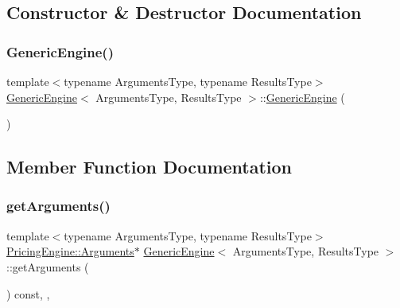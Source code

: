 \subsection{Constructor \& Destructor Documentation}
\hypertarget{class_generic_engine_a080b4df876712b5529b4a19ec3b0c48f}{}\label{class_generic_engine_a080b4df876712b5529b4a19ec3b0c48f} 
\subsubsection{\texorpdfstring{Generic\+Engine()}{GenericEngine()}}
{\footnotesize\ttfamily template$<$typename Arguments\+Type, typename Results\+Type$>$ \\
\hyperlink{class_generic_engine}{Generic\+Engine}$<$ Arguments\+Type, Results\+Type $>$\+::\hyperlink{class_generic_engine}{Generic\+Engine} (\begin{DoxyParamCaption}{ }\end{DoxyParamCaption})\hspace{0.3cm}{\ttfamily [inline]}}



\subsection{Member Function Documentation}
\hypertarget{class_generic_engine_ac2adcbbc8d7b554e2cc1f90e4c4d055d}{}\label{class_generic_engine_ac2adcbbc8d7b554e2cc1f90e4c4d055d} 
\subsubsection{\texorpdfstring{get\+Arguments()}{getArguments()}}
{\footnotesize\ttfamily template$<$typename Arguments\+Type, typename Results\+Type$>$ \\
\hyperlink{class_pricing_engine_1_1_arguments}{Pricing\+Engine\+::\+Arguments}$\ast$ \hyperlink{class_generic_engine}{Generic\+Engine}$<$ Arguments\+Type, Results\+Type $>$\+::get\+Arguments (\begin{DoxyParamCaption}{ }\end{DoxyParamCaption}) const\hspace{0.3cm}{\ttfamily [inline]}, {\ttfamily [override]}, {\ttfamily [virtual]}}



